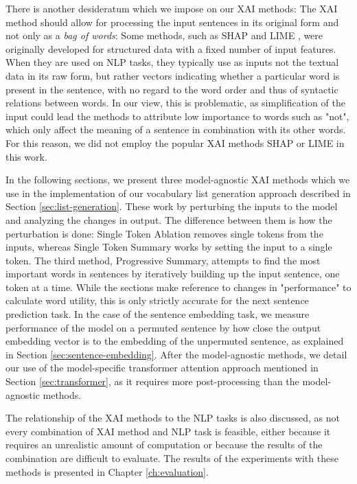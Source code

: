 There is another desideratum which we impose on our XAI methods:
The XAI method should allow for processing the input sentences in its original form and not only as a \textit{bag of words}:
Some methods, such as SHAP \cite{lundbergUnifiedApproachInterpreting2017} and LIME \cite{ribeiroWhyShouldTrust2016}, were originally developed for structured data with a fixed number of input features.
When they are used on NLP tasks, they typically use as inputs not the textual data in its raw form, but rather vectors indicating whether a particular word is present in the sentence, with no regard to the word order and thus of syntactic relations between words.
In our view, this is problematic, as simplification of the input could lead the methods to attribute low importance to words such as "not", which only affect the meaning of a sentence in combination with its other words.
For this reason, we did not employ the popular XAI methods SHAP or LIME in this work.

In the following sections, we present three model-agnostic XAI methods which we use in the implementation of our vocabulary list generation approach described in Section \ref{sec:list-generation}.
These work by perturbing the inputs to the model and analyzing the changes in output.
The difference between them is how the perturbation is done:
Single Token Ablation removes single tokens from the inputs, whereas Single Token Summary works by setting the input to a single token.
The third method, Progressive Summary, attempts to find the most important words in sentences by iteratively building up the input sentence, one token at a time.
While the sections make reference to changes in "performance" to calculate word utility, this is only strictly accurate for the next sentence prediction task.
In the case of the sentence embedding task, we measure performance of the model on a permuted sentence by how close the output embedding vector is to the embedding of the unpermuted sentence, as explained in Section \ref{sec:sentence-embedding}.
After the model-agnostic methods, we detail our use of the model-specific transformer attention approach mentioned in Section \ref{sec:transformer}, as it requires more post-processing than the model-agnostic methods.

The relationship of the XAI methods to the NLP tasks is also discussed, as not every combination of XAI method and NLP task is feasible, either because it requires an unrealistic amount of computation or because the results of the combination are difficult to evaluate.
The results of the experiments with these methods is presented in Chapter \ref{ch:evaluation}.


